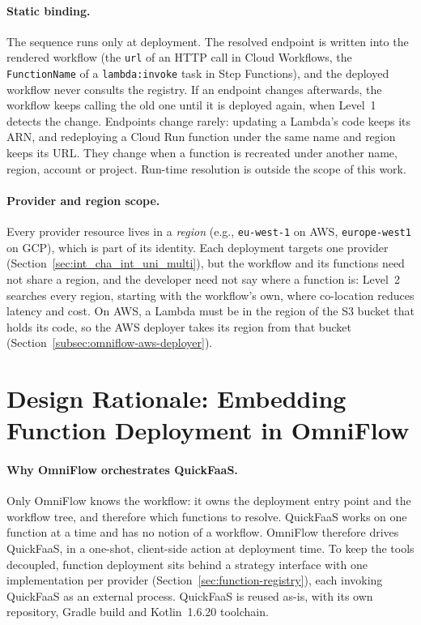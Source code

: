 \paragraph{Static binding.}
The sequence runs only at deployment. The resolved endpoint is written into the rendered workflow
(the \texttt{url} of an HTTP call in Cloud Workflows, the \texttt{FunctionName} of a
\texttt{lambda:invoke} task in Step Functions), and the deployed workflow never consults the
registry. If an endpoint changes afterwards, the workflow keeps calling the old one until it is
deployed again, when Level~1 detects the change. Endpoints change rarely: updating a Lambda's code
keeps its ARN, and redeploying a Cloud Run function under the same name and region keeps its URL.
They change when a function is recreated under another name, region, account or project. Run-time
resolution is outside the scope of this work.

\paragraph{Provider and region scope.}
Every provider resource lives in a \emph{region} (e.g., \texttt{eu-west-1} on AWS,
\texttt{europe-west1} on GCP), which is part of its identity. Each deployment targets one provider
(Section~\ref{sec:int_cha_int_uni_multi}), but the workflow and its functions need not share a
region, and the developer need not say where a function is: Level~2 searches every region,
starting with the workflow's own, where co-location reduces latency and cost. On AWS, a Lambda must
be in the region of the S3 bucket that holds its code, so the AWS deployer takes its region from
that bucket (Section~\ref{subsec:omniflow-aws-deployer}).

\section{Design Rationale: Embedding Function Deployment in OmniFlow}
\label{sec:design-rationale}

\paragraph{Why OmniFlow orchestrates QuickFaaS.}
Only OmniFlow knows the workflow: it owns the deployment entry point and the workflow tree, and
therefore which functions to resolve. QuickFaaS works on one function at a time and has no notion
of a workflow. OmniFlow therefore drives QuickFaaS, in a one-shot, client-side action at deployment
time. To keep the tools decoupled, function deployment sits behind a strategy interface with one
implementation per provider (Section~\ref{sec:function-registry}), each invoking QuickFaaS as an
external process. QuickFaaS is reused as-is, with its own repository, Gradle build and
Kotlin~1.6.20 toolchain.

